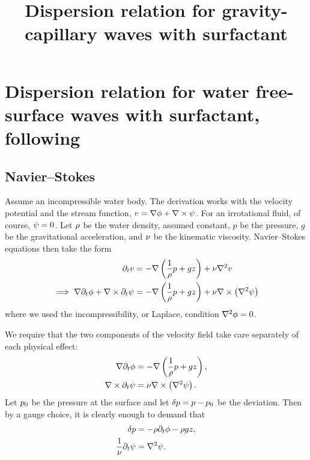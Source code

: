 \documentclass[reqno]{amsart}
\title{Dispersion relation for gravity-capillary waves with surfactant}
\date{}
\numberwithin{equation}{section}
\numberwithin{figure}{section}
\begin{document}
\maketitle

\section{Dispersion relation for water free-surface waves with surfactant, following \texorpdfstring{\cite{Hansen1964}}{Hansen \& Mann (1964)}}

\subsection{Navier--Stokes}

Assume an incompressible water body. The derivation works with the velocity potential and the stream function, $v=\nabla\phi+\nabla\times\psi$. For an irrotational fluid, of course, $\psi=0$. Let $\rho$ be the water density, assumed constant, $p$ be the pressure, $g$ be the gravitational acceleration, and $\nu$ be the kinematic viscosity. Navier--Stokes equations then take the form
\begin{align*}
\partial_{t}v
  &= -\nabla\left(\frac{1}{\rho}p+gz\right)+\nu\nabla^{2}v \\
\implies\nabla\partial_{t}\phi+\nabla\times\partial_{t}\psi
  &= -\nabla\left(\frac{1}{\rho}p+gz\right)+\nu\nabla\times\left(\nabla^{2}\psi\right)
\end{align*}
where we used the incompressibility, or Laplace, condition $\nabla^{2}\phi=0$.

We require that the two components of the velocity field take care separately of each physical effect:
\begin{align*}
\nabla\partial_{t}\phi       &= -\nabla\left(\frac{1}{\rho}p+gz\right), \\
\nabla\times\partial_{t}\psi    &= \nu\nabla\times\left(\nabla^{2}\psi\right).
\end{align*}
Let $p_{0}$ be the pressure at the surface and let $\delta p=p-p_{0}$ be the deviation. Then by a gauge choice, it is clearly enough to demand that
\begin{align}
\delta p                                            &= -\rho\partial_{t}\phi-\rho gz, \label{eq:navier-stokes} \\
\frac{1}{\nu}\partial_{t}\psi  &= \nabla^{2}\psi. \nonumber
\end{align}
\end{document}

